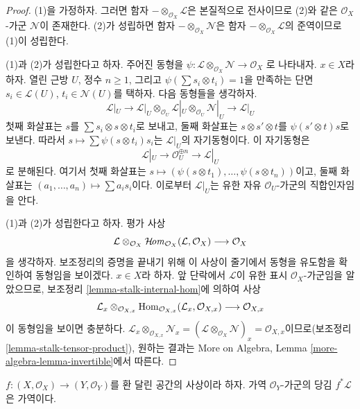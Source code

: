 \begin{proof}
(1)을 가정하자. 그러면 함자 $- \otimes_{\mathcal{O}_X} \mathcal{L}$은
본질적으로 전사이므로 (2)와 같은 $\mathcal{O}_X$-가군
$\mathcal{N}$이 존재한다. (2)가 성립하면 함자
$- \otimes_{\mathcal{O}_X} \mathcal{N}$은 함자
$- \otimes_{\mathcal{O}_X} \mathcal{L}$의 준역이므로 (1)이 성립한다.

\medskip\noindent
(1)과 (2)가 성립한다고 하자. 주어진 동형을
$\psi : \mathcal{L} \otimes_{\mathcal{O}_X} \mathcal{N} \to \mathcal{O}_X$
로 나타내자. $x \in X$라 하자. 열린 근방 $U$, 정수
$n \geq 1$, 그리고 $\psi(\sum s_i \otimes t_i) = 1$을 만족하는 단면
$s_i \in \mathcal{L}(U)$, $t_i \in \mathcal{N}(U)$를 택하자.
다음 동형들을 생각하자.
$$
\mathcal{L}|_U \to
\mathcal{L}|_U \otimes_{\mathcal{O}_U}
\mathcal{L}|_U \otimes_{\mathcal{O}_U} \mathcal{N}|_U \to \mathcal{L}|_U
$$
첫째 화살표는 $s$를 $\sum s_i \otimes s \otimes t_i$로 보내고,
둘째 화살표는 $s \otimes s' \otimes t$를 $\psi(s' \otimes t)s$로 보낸다.
따라서 $s \mapsto \sum \psi(s \otimes t_i)s_i$는
$\mathcal{L}|_U$의 자기동형이다. 이 자기동형은
$$
\mathcal{L}|_U \to \mathcal{O}_U^{\oplus n} \to \mathcal{L}|_U
$$
로 분해된다. 여기서 첫째 화살표는
$s \mapsto (\psi(s \otimes t_1), \ldots, \psi(s \otimes t_n))$이고,
둘째 화살표는 $(a_1, \ldots, a_n) \mapsto \sum a_i s_i$이다.
이로부터 $\mathcal{L}|_U$는 유한 자유 $\mathcal{O}_U$-가군의
직합인자임을 안다.

\medskip\noindent
(1)과 (2)가 성립한다고 하자. 평가 사상
$$
\mathcal{L} \otimes_{\mathcal{O}_X}
\mathop{\mathcal{H}\!\mathit{om}}\nolimits_{\mathcal{O}_X}(\mathcal{L}, \mathcal{O}_X)
\longrightarrow \mathcal{O}_X
$$
을 생각하자. 보조정리의 증명을 끝내기 위해 이 사상이 줄기에서
동형을 유도함을 확인하여 동형임을 보이겠다. $x \in X$라 하자.
앞 단락에서 $\mathcal{L}$이 유한 표시
$\mathcal{O}_X$-가군임을 알았으므로, 보조정리
\ref{lemma-stalk-internal-hom}에 의하여 사상
$$
\mathcal{L}_x \otimes_{\mathcal{O}_{X, x}}
\mathop{\mathrm{Hom}}\nolimits_{\mathcal{O}_{X, x}}(\mathcal{L}_x, \mathcal{O}_{X, x})
\longrightarrow \mathcal{O}_{X, x}
$$
이 동형임을 보이면 충분하다.
$\mathcal{L}_x \otimes_{\mathcal{O}_{X, x}} \mathcal{N}_x =
(\mathcal{L} \otimes_{\mathcal{O}_X} \mathcal{N})_x =
\mathcal{O}_{X, x}$이므로(보조정리 \ref{lemma-stalk-tensor-product}),
원하는 결과는 More on Algebra, Lemma
\ref{more-algebra-lemma-invertible}에서 따른다.
\end{proof}

\begin{lemma}
\label{lemma-pullback-invertible}
$f : (X, \mathcal{O}_X) \to (Y, \mathcal{O}_Y)$를 환 달린 공간의
사상이라 하자. 가역 $\mathcal{O}_Y$-가군의 당김
$f^*\mathcal{L}$은 가역이다.
\end{lemma}

